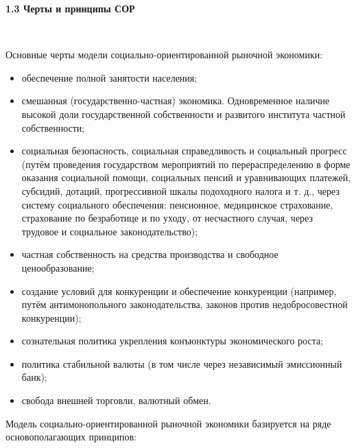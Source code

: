 \documentclass[14pt,a4paper]{article}
\begin{document}
    \begin{center}
        \textbf{1.3 Черты и принципы СОР}
    \end{center}
    \\
    \par
    Основные черты модели социально-ориентированной рыночной экономики:
    \begin{itemize}
        \item обеспечение полной занятости населения;
        \item смешанная (государственно-частная) экономика. Одновременное наличие высокой доли государственной собственности и развитого института частной собственности;
        \item социальная безопасность, социальная справедливость и социальный прогресс (путём проведения государством мероприятий по перераспределению в форме оказания социальной помощи, социальных пенсий и уравнивающих платежей, субсидий, дотаций, прогрессивной шкалы подоходного налога и т. д., через систему социального обеспечения: пенсионное, медицинское страхование, страхование по безработице и по уходу, от несчастного случая, через трудовое и социальное законодательство);
        \item частная собственность на средства производства и свободное ценообразование;
        \item создание условий для конкуренции и обеспечение конкуренции (например, путём антимонопольного законодательства, законов против недобросовестной конкуренции);
        \item сознательная политика укрепления конъюнктуры экономического роста;
        \item политика стабильной валюты (в том числе через независимый эмиссионный банк);
        \item свобода внешней торговли, валютный обмен.
    \end{itemize}
    \par
    Модель социально-ориентированной рыночной экономики базируется на ряде основополагающих принципов:
\end{document}
